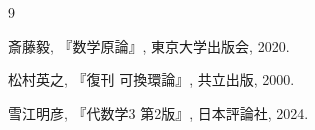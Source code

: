 
{}
\begin{thebibliography}{9}

斎藤毅,
『数学原論』,
東京大学出版会, 2020.

松村英之,
『復刊 可換環論』,
共立出版, 2000.

雪江明彦,
『代数学3 第2版』,
日本評論社, 2024.

\end{thebibliography}
